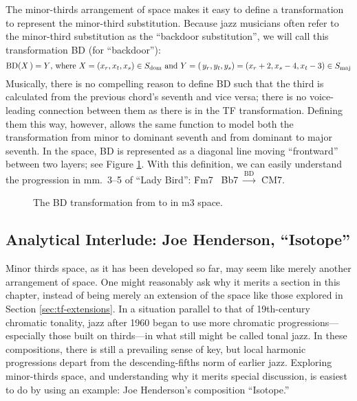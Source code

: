 The minor-thirds arrangement of \tf space makes it easy to define a
transformation to represent the minor-third substitution. Because jazz
musicians often refer to the minor-third substitution as the ``backdoor
substitution'',  we will call this transformation BD (for ``backdoor''):%
%
\begin{displaymath}
    \mathrm{BD}(X\,) = Y\text{, where}\ X = (x_r, x_t, x_s) \in S_{\mathrm{dom}}
    \text{ and}\
    Y = (\,y_r, y_t, y_s) = (x_r + 2, x_s - 4, x_t - 3) \in S_{\mathrm{maj}}
\end{displaymath}%
%
Musically, there is no compelling reason to define BD such that the third is
calculated from the previous chord's seventh and vice versa; there is no
voice-leading connection between them as there is in the TF transformation.
Defining them this way, however, allows the same function to model both the
transformation from minor to dominant seventh and from dominant to major
seventh.\fn{mts-4} In the space, BD is represented as a diagonal line moving
``frontward'' between two layers; see Figure \ref{mts:bd-transformation}. With
this definition, we can easily understand the progression in mm.~3--5 of
``Lady Bird'': \h{Fm7} \TFarrow\ \h{Bb7} $\xrightarrow{\mathrm{BD}}$\ \h{CM7}.

\begin{figure}[tbp]
  \caption[The BD transformation in m3 space.]{The BD transformation from
    \caph{Bb7} to \caph{CM7} in m3 space.}
  \label{mts:bd-transformation}
\end{figure}

\subsection{Analytical Interlude: Joe Henderson, “Isotope”}
\label{sec:henderson-isotope}
\FloatBarrier

Minor thirds space, as it has been developed so far, may seem like merely
another arrangement of \tf space. One might reasonably ask why it merits a
section in this chapter, instead of being merely an extension of the space
like those explored in Section \ref{sec:tf-extensions}. In a situation
parallel to that of 19th-century chromatic tonality, jazz after 1960 began to
use more chromatic progressions---\allowbreak especially those built on
thirds---in what still might be called tonal jazz. In these compositions, there
is still a prevailing sense of key, but local harmonic progressions depart
from the descending-fifths norm of earlier jazz.\fn{mts-5} Exploring
minor-thirds space, and understanding why it merits special discussion, is
easiest to do by using an example: Joe Henderson's composition
``Isotope.''

